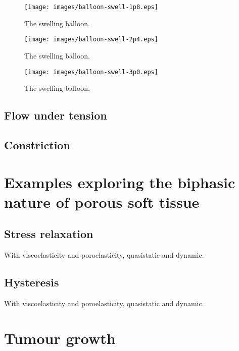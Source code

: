 \begin{figure}
\centering
{\texttt{[image: images/balloon-swell-1p8.eps]}}
\caption{The swelling balloon.} 
\label{swelling-balloon-image-3}
\end{figure}

\begin{figure}
\centering
{\texttt{[image: images/balloon-swell-2p4.eps]}}
\caption{The swelling balloon.} 
\label{swelling-balloon-image-4}
\end{figure}

\begin{figure}
\centering
{\texttt{[image: images/balloon-swell-3p0.eps]}}
\caption{The swelling balloon.} 
\label{swelling-balloon-image-5}
\end{figure}

\subsection{Flow under tension}
\label{tenson-flow}

\subsection{Constriction}
\label{constriction-2}

\section{Examples exploring the biphasic nature of porous soft tissue}
\label{biphasic-examples-2}

\subsection{Stress relaxation}
\label{stress-relaxation}
With viscoelasticity and poroelasticity, quasistatic and dynamic.

\subsection{Hysteresis}
\label{hysteresis}
With viscoelasticity and poroelasticity, quasistatic and dynamic.

\section{Tumour growth}
\label{tumor-growth}
